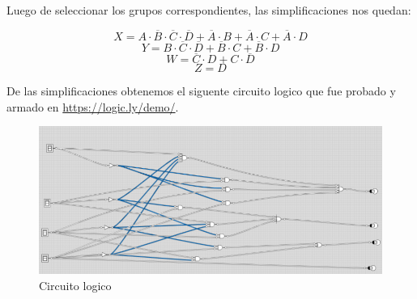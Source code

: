 Luego de seleccionar los grupos correspondientes, las simplificaciones nos quedan:
\begin{center}
		$$ X =  A \cdot \overline{B} \cdot \overline{C} \cdot \overline{D} +\overline{A} \cdot B +\overline{A} \cdot C +\overline{A} \cdot D$$
		$$ Y =  B \cdot \overline{C} \cdot \overline{D}  +  \overline{B} \cdot C + \overline{B} \cdot D $$
		$$ W = \overline{C} \cdot D  + C \cdot \overline{D} $$
		$$ Z =   D $$
\end{center}
De las simplificaciones obtenemos el siguente circuito logico que fue probado y armado en \href{https://logic.ly/demo/}{https://logic.ly/demo/}.
\begin{figure}[h!]
	\centering
	\includegraphics[width=\linewidth]{Ejercicios/CircuitoLogico.png}
	\caption{Circuito logico}
\end{figure}

